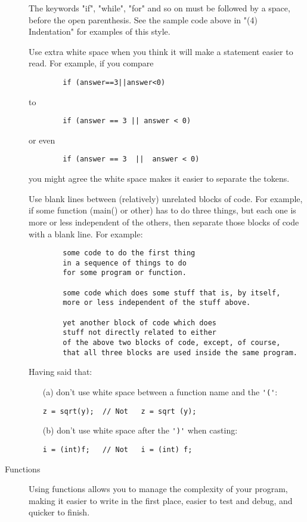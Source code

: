 \begin{description}
    The keywords "if", "while", "for" and so on must be followed by a
    space, before the open parenthesis.  See the sample code above in
    "(4) Indentation" for examples of this style.

    Use extra white space when you think it will make a statement
    easier to read.  For example, if you compare
\begin{verbatim}
        if (answer==3||answer<0)
\end{verbatim}
    to
\begin{verbatim}
        if (answer == 3 || answer < 0)
\end{verbatim}    
    or even
\begin{verbatim}
        if (answer == 3  ||  answer < 0)
 \end{verbatim}
    you might agree the white space makes it easier to separate the
    tokens.

    Use blank lines between (relatively) unrelated blocks of code.
    For example, if some function (main() or other) has to do
    three things, but each one is more or less independent of the
    others, then separate those blocks of code with a blank line.
    For example:
\begin{verbatim}
        some code to do the first thing
        in a sequence of things to do
        for some program or function.

        some code which does some stuff that is, by itself,
        more or less independent of the stuff above.

        yet another block of code which does
        stuff not directly related to either
        of the above two blocks of code, except, of course,
        that all three blocks are used inside the same program.
\end{verbatim}
    Having said that:
\begin{itemize}
            \item[(a)] don't use white space between a function name and the \verb|'('|: \hfill
            
            \verb|z = sqrt(y);  // Not   z = sqrt (y);|
            \item[(b)] don't use white space after the \verb|')'| when casting: \hfill
            
            \verb|i = (int)f;   // Not   i = (int) f;|
            \end{itemize}
\clearpage
\item[Functions] \hfill

    Using functions allows you to manage the complexity of your
    program, making it easier to write in the first place, easier to
    test and debug, and quicker to finish.


\end{description}
